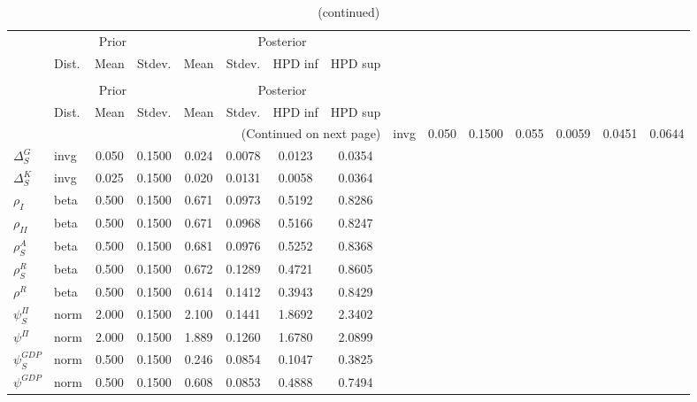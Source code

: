  
\begin{center}
\begin{longtable}{llcccccc} 
\caption{Results from Metropolis-Hastings (parameters)}
 \label{Table:MHPosterior:1}\\
\toprule 
  & \multicolumn{3}{c}{Prior}  &  \multicolumn{4}{c}{Posterior} \\
  \cmidrule(r{.75em}){2-4} \cmidrule(r{.75em}){5-8}
  & Dist. & Mean  & Stdev. & Mean & Stdev. & HPD inf & HPD sup\\
\midrule \endfirsthead 
\caption{(continued)}\\\toprule 
  & \multicolumn{3}{c}{Prior}  &  \multicolumn{4}{c}{Posterior} \\
  \cmidrule(r{.75em}){2-4} \cmidrule(r{.75em}){5-8}
  & Dist. & Mean  & Stdev. & Mean & Stdev. & HPD inf & HPD sup\\
\midrule \endhead 
\bottomrule \multicolumn{8}{r}{(Continued on next page)} \endfoot 
\bottomrule \endlastfoot 
${\Delta^{A}_{S}}$ & invg &   0.050 & 0.1500 &   0.055& 0.0059 &  0.0451 &  0.0644 \\ 
${\Delta^{G}_{S}}$ & invg &   0.050 & 0.1500 &   0.024& 0.0078 &  0.0123 &  0.0354 \\ 
${\Delta^{K}_{S}}$ & invg &   0.025 & 0.1500 &   0.020& 0.0131 &  0.0058 &  0.0364 \\ 
${\rho_{I}}$ & beta &   0.500 & 0.1500 &   0.671& 0.0973 &  0.5192 &  0.8286 \\ 
${\rho_{II}}$ & beta &   0.500 & 0.1500 &   0.671& 0.0968 &  0.5166 &  0.8247 \\ 
${\rho^{A}_{S}}$ & beta &   0.500 & 0.1500 &   0.681& 0.0976 &  0.5252 &  0.8368 \\ 
${\rho^{R}_{S}}$ & beta &   0.500 & 0.1500 &   0.672& 0.1289 &  0.4721 &  0.8605 \\ 
${\rho^{R}}$ & beta &   0.500 & 0.1500 &   0.614& 0.1412 &  0.3943 &  0.8429 \\ 
${\psi^{\Pi}_{S}}$ & norm &   2.000 & 0.1500 &   2.100& 0.1441 &  1.8692 &  2.3402 \\ 
${\psi^{\Pi}}$ & norm &   2.000 & 0.1500 &   1.889& 0.1260 &  1.6780 &  2.0899 \\ 
${\psi^{GDP}_{S}}$ & norm &   0.500 & 0.1500 &   0.246& 0.0854 &  0.1047 &  0.3825 \\ 
${\psi^{GDP}}$ & norm &   0.500 & 0.1500 &   0.608& 0.0853 &  0.4888 &  0.7494 \\ 
\end{longtable}
 \end{center}

